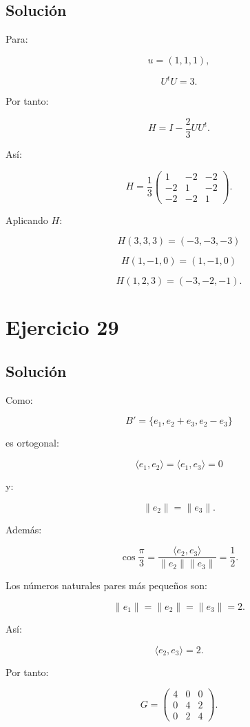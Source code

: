 \documentclass[11pt,a4paper]{article}
\begin{document}
\subsection{Solución}

Para:

\[
u=(1,1,1),
\]

\[
U^tU=3.
\]

Por tanto:

\[
H
=
I-\frac23UU^t.
\]

Así:

\[
\boxed{
H=
\frac13
\begin{pmatrix}
1&-2&-2\\
-2&1&-2\\
-2&-2&1
\end{pmatrix}.
}
\]

Aplicando $H$:

\[
\boxed{
H(3,3,3)=(-3,-3,-3)
}
\]

\[
\boxed{
H(1,-1,0)=(1,-1,0)
}
\]

\[
\boxed{
H(1,2,3)=(-3,-2,-1).
}
\]

\section{Ejercicio 29}
\subsection{Solución}

Como:

\[
B'=\{e_1,e_2+e_3,e_2-e_3\}
\]

es ortogonal:

\[
\langle e_1,e_2\rangle
=
\langle e_1,e_3\rangle
=
0
\]

y:

\[
\|e_2\|=\|e_3\|.
\]

Además:

\[
\cos\frac{\pi}{3}
=
\frac{\langle e_2,e_3\rangle}
{\|e_2\|\|e_3\|}
=
\frac12.
\]

Los números naturales pares más pequeños son:

\[
\|e_1\|=\|e_2\|=\|e_3\|=2.
\]

Así:

\[
\langle e_2,e_3\rangle=2.
\]

Por tanto:

\[
\boxed{
G=
\begin{pmatrix}
4&0&0\\
0&4&2\\
0&2&4
\end{pmatrix}.
}
\]
\end{document}
